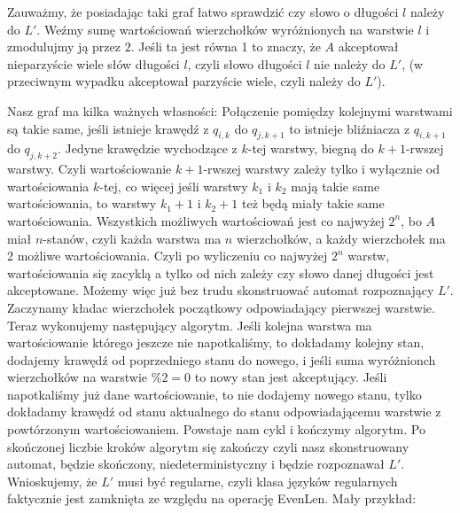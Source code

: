 \documentclass{article}
\begin{document}
Zauważmy, że posiadając taki graf łatwo sprawdzić czy słowo o długości $l$ należy do $L'$. Weźmy sumę wartościowań wierzchołków wyróżnionych na warstwie $l$ i zmodulujmy ją przez $2$. Jeśli ta jest równa 1 to znaczy, że $A$ akceptował nieparzyście wiele słów długości $l$, czyli słowo długości $l$ nie należy do $L'$, (w przeciwnym wypadku akceptował parzyście wiele, czyli należy do $L'$). \newline \newline

Nasz graf ma kilka ważnych własności: \newline Połączenie pomiędzy kolejnymi warstwami są takie same, jeśli istnieje krawędź z $q_{i,k}$ do $q_{j,k+1}$ to istnieje bliźniacza z $q_{i,k+1}$ do $q_{j,k+2}$. \newline Jedyne krawędzie wychodzące z $k$-tej warstwy, biegną do $k+1$-rwszej warstwy. \newline 
Czyli wartościowanie $k+1$-rwszej warstwy zależy tylko i wyłącznie od wartościowania $k$-tej, co więcej jeśli warstwy $k_1$ i $k_2$ mają takie same wartościowania, to warstwy $k_1+1$ i $k_2+1$ też będą miały takie same wartościowania. \newline 
Wszystkich możliwych wartościowań jest co najwyżej $2^n$, bo $A$ miał $n$-stanów, czyli każda warstwa ma $n$ wierzchołków, a każdy wierzchołek ma 2 możliwe wartościowania. \newline 
Czyli po wyliczeniu co najwyżej $2^n$ warstw, wartościowania się zacyklą a tylko od nich zależy czy słowo danej długości jest akceptowane. \newline \newline 
Możemy więc już bez trudu skonstruować automat rozpoznający $L'$. \newline \newline 
Zaczynamy kładac wierzchołek początkowy odpowiadający pierwszej warstwie. Teraz wykonujemy następujący algorytm. Jeśli kolejna warstwa ma wartościowanie którego jeszcze nie napotkaliśmy, to dokładamy kolejny stan, dodajemy krawędź od poprzedniego stanu do nowego, i jeśli suma wyróżnionch wierzchołków na warstwie $\%2 = 0$ to nowy stan jest akceptujący. \newline 
Jeśli napotkaliśmy już dane wartościowanie, to nie dodajemy nowego stanu, tylko dokładamy krawędź od stanu aktualnego do stanu odpowiadającemu warstwie z powtórzonym wartościowaniem. Powstaje nam cykl i kończymy algorytm. \newline Po skończonej liczbie kroków algorytm się zakończy czyli nasz skonstruowany automat, będzie skończony, niedeterministyczny i będzie rozpoznawał $L'$. \newline 
Wnioskujemy, że $L'$ musi być regularne, czyli klasa języków regularnych faktycznie jest zamknięta ze względu na operację EvenLen. \newline \newline
Mały przykład: \newline 
\end{document}
